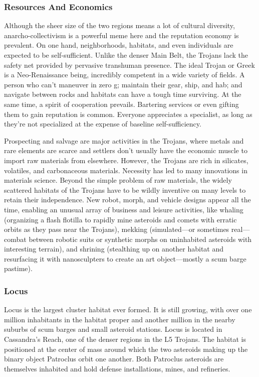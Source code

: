 \subsubsection{Resources And Economics}

Although the sheer size of the two regions means 
a lot of cultural diversity, anarcho-collectivism is a 
powerful meme here and the reputation economy is 
prevalent. On one hand, neighborhoods, habitats, 
and even individuals are expected to be self-sufficient. 
Unlike the denser Main Belt, the Trojans lack the 
safety net provided by pervasive transhuman presence. The ideal Trojan or Greek is a Neo-Renaissance 
being, incredibly competent in a wide variety of fields. 
A person who can't maneuver in zero g; maintain 
their gear, ship, and hab; and navigate between rocks 
and habitats can have a tough time surviving. At the 
same time, a spirit of cooperation prevails. Bartering 
services or even gifting them to gain reputation is 
common. Everyone appreciates a specialist, as long 
as they're not specialized at the expense of baseline 
self-sufficiency.

Prospecting and salvage are major activities in 
the Trojans, where metals and rare elements are 
scarce and settlers don't usually have the economic 
muscle to import raw materials from elsewhere. 
However, the Trojans are rich in silicates, volatiles, 
and carbonaceous materials. Necessity has led to 
many innovations in materials science. Beyond the 
simple problem of raw materials, the widely scattered habitats of the Trojans have to be wildly inventive on many levels to retain their independence. 
New robot, morph, and vehicle designs appear all 
the time, enabling an unusual array of business and 
leisure activities, like whaling (organizing a flash 
flotilla to rapidly mine asteroids and comets with erratic orbits as they pass near the Trojans), mekking 
(simulated—or sometimes real—combat between 
robotic suits or synthetic morphs on uninhabited asteroids with interesting terrain), and shrining 
(stealthing up on another habitat and resurfacing it 
with nanosculpters to create an art object—mostly a 
scum barge pastime).

\subsubsection{Locus}

Locus is the largest cluster habitat ever formed. It 
is still growing, with over one million inhabitants 
in the habitat proper and another million in the 
nearby suburbs of scum barges and small asteroid 
stations. Locus is located in Cassandra's Reach, one 
of the denser regions in the L5 Trojans. The habitat 
is positioned at the center of mass around which the 
two asteroids making up the binary object Patroclus orbit one another. Both Patroclus asteroids are 
themselves inhabited and hold defense installations, 
mines, and refineries.

